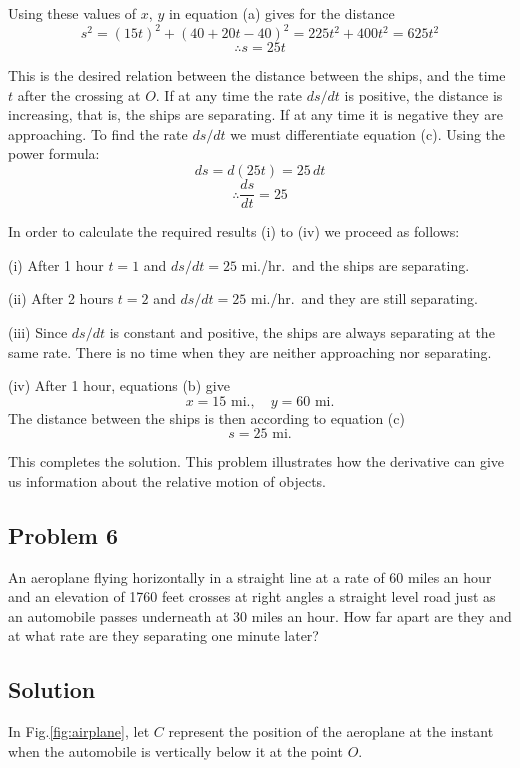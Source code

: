 Using these values of $x$, $y$ in equation (a) gives for the distance
\[s^2 = (15t)^2 + (40 + 20t - 40)^2 = 225t^2 + 400t^2 = 625t^2\]
\[\therefore s = 25t \tag{c}\]

This is the desired relation between the distance between the ships, and the time $t$ after the crossing at $O$. If at any time the rate $ds/dt$ is positive, the distance is increasing, that is, the ships are separating. If at any time it is negative they are approaching. To find the rate $ds/dt$ we must differentiate equation (c). Using the power formula:
\[ds = d(25t) = 25\,dt\]
\[\therefore \frac{ds}{dt} = 25 \tag{d}\]

In order to calculate the required results (i) to (iv) we proceed as follows:

(i) After 1 hour $t = 1$ and $ds/dt = 25$ mi./hr.\ and the ships are separating.

(ii) After 2 hours $t = 2$ and $ds/dt = 25$ mi./hr.\ and they are still separating.

(iii) Since $ds/dt$ is constant and positive, the ships are always separating at the same rate. There is no time when they are neither approaching nor separating.

(iv) After 1 hour, equations (b) give
\[x = 15\text{ mi.}, \quad y = 60\text{ mi.}\]
The distance between the ships is then according to equation (c)
\[s = 25\text{ mi.}\]

This completes the solution. This problem illustrates how the derivative can give us information about the relative motion of objects.

\subsection*{Problem 6}
An aeroplane flying horizontally in a straight line at a rate of 60 miles an hour and an elevation of 1760 feet crosses at right angles a straight level road just as an automobile passes underneath at 30 miles an hour. How far apart are they and at what rate are they separating one minute later?

\subsection*{Solution}
In Fig.\ref{fig:airplane}, let $C$ represent the position of the aeroplane at the instant when the automobile is vertically below it at the point $O$.


